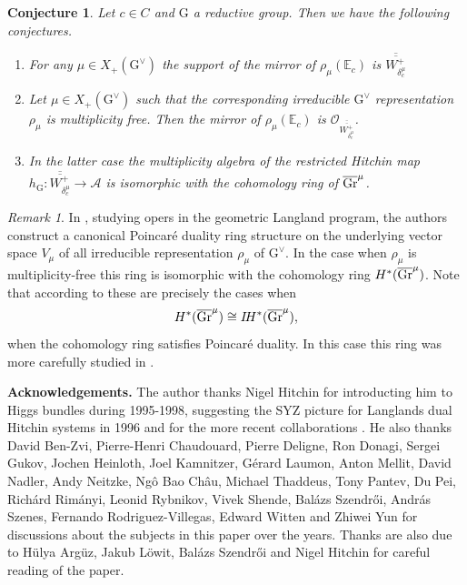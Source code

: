 \documentclass[12pt]{article}
\numberwithin{equation}{section}
\newtheorem{conjecture}[theorem]{Conjecture}
\theoremstyle{remark}
\newtheorem{remark}[theorem]{Remark}
\numberwithin{theorem}{section}
\def\bE{{\mathbb{E}}}
\def\calA{{\mathcal{A}}}
\def\calO{{\mathcal O}}
\newcommand{\Gr}{\textnormal{Gr}}
\newcommand{\G}{\mathrm{G}}
\numberwithin{equation}{section}
\begin{document}
\begin{conjecture}\label{geomsati} Let $c\in C$ and $\G$ a reductive group. Then we have the following conjectures. \begin{enumerate}
		\item For any $\mu\in X_+(\G^\vee)$ the support of the mirror of  $\rho_\mu(\bE_c)$ is $\overline{\overline{W^+_{\delta_c^\mu}}}$
		\item Let $\mu\in X_+(\G^\vee)$ such that the corresponding irreducible $\G^\vee$ representation $
		\rho_\mu$ is multiplicity free. Then the mirror of $\rho_\mu(\bE_c)$ is $\calO_{\overline{\overline{W^+_{\delta_c^\mu}}}}$. 
		\item In the latter case the multiplicity algebra of the restricted Hitchin map $h_\G:\overline{\overline{W^+_{\delta_c^\mu}}}\to \calA$ is isomorphic with the cohomology ring of $\overline{\Gr}^\mu$. 
	\end{enumerate}
\end{conjecture}




\begin{remark} In \cite{feigin-frenkel-rybnikov}, studying opers in the geometric Langland program, the authors construct a canonical Poincar\'e duality ring structure on the underlying vector space $V_\mu$ of all irreducible representation $\rho_\mu$ of $\G^\vee$. In the case when $\rho_\mu$ is multiplicity-free this ring is isomorphic with the cohomology ring $H^*(\overline{\Gr}^\mu)$. Note that according to 
	\cite[Theorem 1.5]{ginzburg} these are precisely the cases when $$H^*(\overline{\Gr}^\mu)\cong  I\!H^*(\overline{\Gr}^\mu),$$ when the cohomology ring satisfies Poincar\'e duality. In this case this ring was more carefully studied in \cite{panyushev}.
\end{remark}






{\noindent \bf Acknowledgements.} 
The author thanks Nigel Hitchin for introducting him to Higgs bundles during 1995-1998, suggesting the SYZ picture for Langlands dual Hitchin systems in 1996 and for the more recent collaborations \cite{hausel-hitchin,hausel-hitchin1}. He also thanks David Ben-Zvi, Pierre-Henri Chaudouard, Pierre Deligne, Ron Donagi, Sergei Gukov, Jochen Heinloth, Joel Kamnitzer, G\'erard Laumon, Anton Mellit, David Nadler, Andy Neitzke,  Ng\^{o} Bao Ch\^au, Michael Thaddeus, Tony Pantev, Du Pei, Rich\'ard Rim\'anyi, Leonid Rybnikov, Vivek Shende, Bal\'azs Szendrői, Andr\'as Szenes, Fernando Rodriguez-Villegas, Edward Witten and Zhiwei Yun for discussions about the subjects in this paper over the years. Thanks are also due to H\"ulya Arg\"uz, Jakub L\"owit, Bal\'azs Szendr{\H{o}}i and Nigel Hitchin for careful reading of the paper. 
\end{document}
